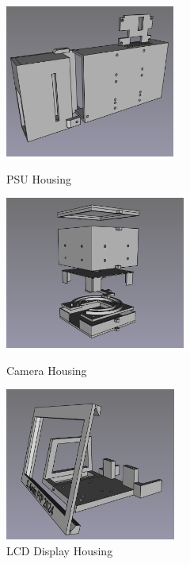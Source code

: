 
\begin{figure}
  \begin{minipage}[t]{0.32\textwidth}
    \centering
    \includegraphics[width=\textwidth,height=5cm]{imgs/freecad/psu_mount.jpg}
    \caption{PSU Housing}
  \end{minipage}
  \hfill
  \begin{minipage}[t]{0.32\textwidth}
    \centering
    \includegraphics[width=\textwidth,height=5cm]{imgs/freecad/camera_case.jpg}
    \caption{Camera Housing}
    \label{fig:camerahousing}
  \end{minipage}
  \hfill
  \begin{minipage}[t]{0.32\textwidth}
    \centering
    \includegraphics[width=\textwidth,height=5cm]{imgs/freecad/lcd_mount.jpg}
    \caption{LCD Display Housing}
  \end{minipage}
\end{figure}











